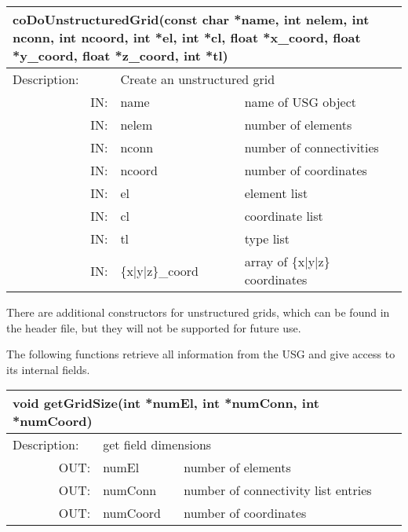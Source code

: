 \begin{htmlonly}
\begin{longtable}{|p{4cm}|p{2.5cm}|p{7cm}|}
\hline
\multicolumn{3}{|p{13.5cm}|}{\bf coDoUnstructuredGrid(const char *name,\newline
              int nelem, int nconn, int ncoord, int *el, int *cl,\newline
	      float *x\_coord, float *y\_coord, float *z\_coord,\newline
	      int *tl)}\\
\hline
{Description:}  
       & \multicolumn{2}{p{9.5cm}|}{Create an unstructured grid} \\
\hline
\multicolumn{1}{|r|}{IN:} & {name} 
                          & {name of USG object}\\
\hline
\multicolumn{1}{|r|}{IN:} & {nelem} 
                          & {number of elements}\\
\hline
\multicolumn{1}{|r|}{IN:} & {nconn} 
                          & {number of connectivities}\\
\hline
\multicolumn{1}{|r|}{IN:} & {ncoord} 
                          & {number of coordinates}\\
\hline
\multicolumn{1}{|r|}{IN:} & {el} 
                          & {element list}\\
\hline
\multicolumn{1}{|r|}{IN:} & {cl} 
                          & {coordinate list}\\
\hline
\multicolumn{1}{|r|}{IN:} & {tl} 
                          & {type list}\\
\hline
\multicolumn{1}{|r|}{IN:} & {\{x|y|z\}\_coord} 
                          & {array of \{x|y|z\} 
			  coordinates}\endhead 
\hline
\end{longtable}
\end{htmlonly}

There are additional constructors for unstructured grids, which can be found in 
the header file, but they will not be supported for future use. 


The following functions retrieve all information from the USG and give access 
to its internal fields. 

 
\begin{longtable}{|p{4cm}|p{2.5cm}|p{7cm}|}
\hline
\multicolumn{3}{|p{13.5cm}|}{\bf void getGridSize(int *numEl, int *numConn, 
   int *numCoord)}\\
\hline
{Description:}  
       & \multicolumn{2}{p{9.5cm}|}{get field dimensions} \\
\hline
\multicolumn{1}{|r|}{OUT:} & {numEl} 
                           & {number of elements}\\
\hline
\multicolumn{1}{|r|}{OUT:} & {numConn} 
                           & {number of connectivity list entries}\\
\hline
\multicolumn{1}{|r|}{OUT:} & {numCoord} 
                           & {number of coordinates}\endhead
\hline
\end{longtable}

